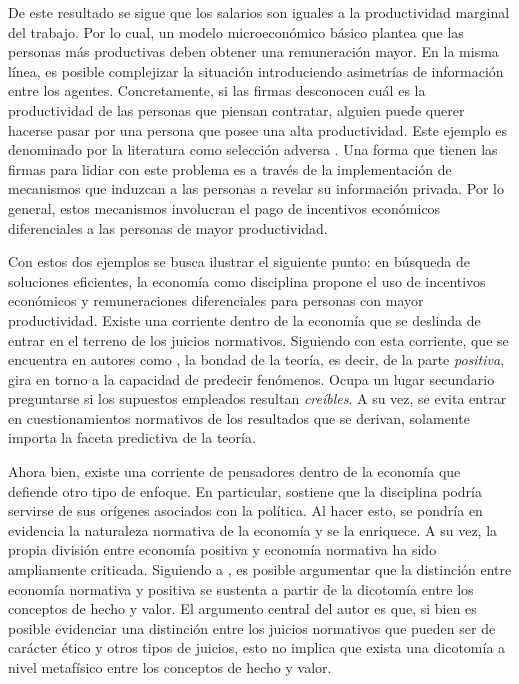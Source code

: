 De este resultado se sigue que los salarios son iguales a la productividad marginal del trabajo. Por lo cual, un modelo microeconómico básico plantea que las personas más productivas deben obtener una remuneración mayor. En la misma línea, es posible complejizar la situación introduciendo asimetrías de información entre los agentes. Concretamente, si las firmas desconocen cuál es la productividad de las personas que piensan contratar, alguien puede querer hacerse pasar por una persona que posee una alta productividad. Este ejemplo es denominado por la literatura como selección adversa \citep{Laffont_2002}. Una forma que tienen las firmas para lidiar con este problema es a través de la implementación de mecanismos que induzcan a las personas a revelar su información privada. Por lo general, estos mecanismos involucran el pago de incentivos económicos diferenciales a las personas de mayor productividad.



Con estos dos ejemplos se busca ilustrar el siguiente punto: en búsqueda de soluciones eficientes, la economía como disciplina propone el uso de incentivos económicos y remuneraciones diferenciales para personas con mayor productividad. Existe una corriente dentro de la economía que se deslinda de entrar en el terreno de los juicios normativos. Siguiendo con esta corriente, que se encuentra en autores como \citet{Friedman_1966}, la bondad de la teoría, es decir, de la parte \textit{positiva}, gira en torno a la capacidad de predecir fenómenos. Ocupa un lugar secundario preguntarse si los supuestos empleados resultan \textit{creíbles}. A su vez, se evita entrar en cuestionamientos normativos de los resultados que se derivan, solamente importa la faceta predictiva de la teoría.

Ahora bien, existe una corriente de pensadores dentro de la economía que defiende otro tipo de enfoque. En particular, \citet{Sen_1991} sostiene que la disciplina podría servirse de sus orígenes asociados con la política. Al hacer esto, se pondría en evidencia la naturaleza normativa de la economía y se la enriquece. A su vez, la propia división entre economía positiva y economía normativa ha sido ampliamente criticada. Siguiendo a \citet{Putnam_2004}, es posible argumentar que la distinción entre economía normativa y positiva se sustenta a partir de la dicotomía entre los conceptos de hecho y valor. El argumento central del autor es que, si bien es posible evidenciar una distinción entre los juicios normativos que pueden ser de carácter ético y otros tipos de juicios, esto no implica que exista una dicotomía a nivel metafísico entre los conceptos de hecho y valor. 

